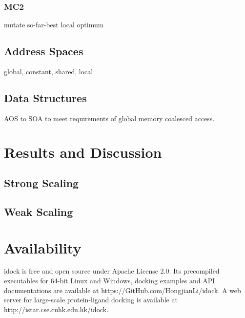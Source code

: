 \documentclass[10pt, conference, compsocconf]{../IEEEtran}
\begin{document}
\subsubsection{MC2}
mutate so-far-best local optimum

\subsection{Address Spaces}

global, constant, shared, local

\subsection{Data Structures}

AOS to SOA to meet requirements of global memory coalesced access.

\section{Results and Discussion}

\subsection{Strong Scaling}



\subsection{Weak Scaling}



\section{Availability}

idock is free and open source under Apache License 2.0. Its precompiled executables for 64-bit Linux and Windows, docking examples and API documentations are available at https://GitHub.com/HongjianLi/idock. A web server for large-scale protein-ligand docking is available at http://istar.cse.cuhk.edu.hk/idock.



\end{document}
